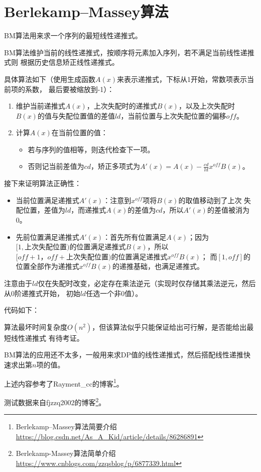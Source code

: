 \section{Berlekamp–Massey算法}
BM算法用来求一个序列的最短线性递推式。

BM算法维护当前的线性递推式，按顺序将元素加入序列，若不满足当前线性递推式则
根据历史信息矫正线性递推式。

具体算法如下（使用生成函数$A(x)$来表示递推式，下标从1开始，常数项表示当前项的系数，
最后要被缩放到-1）：
\begin{enumerate}
    \item 维护当前递推式$A(x)$，上次失配时的递推式$B(x)$，以及上次失配时
    $B(x)$的值与失配位置值的差值$ld$，当前位置与上次失配位置的偏移$off$。
    \item 计算$A(x)$在当前位置的值：
    \begin{itemize}
        \item 若与序列的值相等，则迭代检查下一项。
        \item 否则记当前差值为$cd$，矫正多项式为$A'(x)=A(x)-\frac{cd}{ld}x^{off}B(x)$。
    \end{itemize}
\end{enumerate}

接下来证明算法正确性：

\begin{itemize}
    \item 当前位置满足递推式$A'(x)$：注意到$x^{off}$项将$B(x)$的取值移动到了上次
    失配位置，差值为$ld$，而递推式$A(x)$的差值为$cd$，所以$A'(x)$的差值被消为0。
    \item 先前位置满足递推式$A'(x)$：首先所有位置满足$A(x)$；因为
    $[1,\textrm{上次失配位置})$的位置满足递推式$B(x)$，所以
    $[off+1，off+\textrm{上次失配位置})$的位置满足递推式$x^{off}B(x)$；
    而$[1,off]$的位置全部作为递推式$x^{off}B(x)$的递推基础，也满足递推式。
\end{itemize}

注意由于$ld$仅在失配时改变，必定存在乘法逆元（实现时仅存储其乘法逆元，然后从0阶递推式开始，
初始$ld$任选一个非0值）。

代码如下：


算法最坏时间复杂度$O(n^2)$，但该算法似乎只能保证给出可行解，是否能给出最短线性递推式
有待考证。

BM算法的应用还不太多，一般用来求DP值的线性递推式，然后搭配线性递推快速求出第$n$项的值。

上述内容参考了Rayment\_cc的博客\footnote{
    Berlekamp–Massey算法简要介绍\\
    \url{https://blog.csdn.net/As\_A\_Kid/article/details/86286891}
}。

测试数据来自fjzzq2002的博客\footnote{
    Berlekamp-Massey算法简单介绍\\
    \url{https://www.cnblogs.com/zzqsblog/p/6877339.html}
}。
